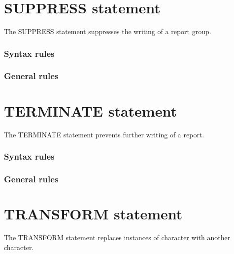 \section{SUPPRESS statement}

The SUPPRESS statement suppresses the writing of a report group.

\begin{syntax}
\end{syntax}

\subsubsection{Syntax rules}

\subsubsection{General rules}

\section{TERMINATE statement}

The TERMINATE statement prevents further writing of a report.

\begin{syntax}
\end{syntax}

\subsubsection{Syntax rules}

\subsubsection{General rules}

\section{TRANSFORM statement}

The TRANSFORM statement replaces instances of character with another character.

\begin{syntax}[\deletedcolour]
   \identifier {}
  \begin{1=}
    \identifier \\
    \literal
  \end{1=}
  \begin{1=}
    \identifier \\
    \literal
  \end{1=}
\end{syntax}

